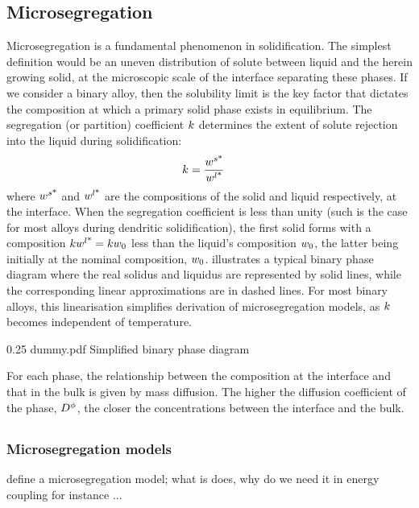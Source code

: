 \subsection{Microsegregation}
Microsegregation is a fundamental phenomenon in solidification. The simplest definition would be 
an uneven distribution of solute between liquid and the herein growing solid, at the microscopic scale
of the interface separating these phases. If we consider a binary alloy, then the solubility limit is 
the key factor that dictates the composition at which a primary solid phase exists in equilibrium. 
The segregation (or partition) coefficient $k$ determines the extent of solute rejection into the liquid during solidification:
\begin{align}
\label{eq:partition}
& k = \frac{{w}^{s \text{*}} }{{w}^{l \text{*}} }
\end{align}
where ${w}^{s \text{*}} $ and ${w}^{l \text{*}} $ are the compositions of the solid and liquid respectively, at the interface. When the 
segregation coefficient is less than unity (such is the case for most alloys during dendritic solidification), 
the first solid forms with a composition $k {w}^{l \text{*}} =k {w}_0$ less than the liquid's 
composition ${w}_0$, the latter being initially at the nominal composition, ${w}_0$.  illustrates a typical binary 
phase diagram where the real solidus and liquidus are represented by solid lines, while the corresponding linear approximations are in dashed lines.
For most binary alloys, this linearisation simplifies derivation of microsegregation models, as $k$ becomes independent of temperature.
\begin{figureth}
{0.25}
{dummy.pdf}
{Simplified binary phase diagram}
\label{fig:binary_diag}
\end{figureth}
For each phase, the relationship between the composition at the interface and that in the bulk is given by mass diffusion.
The higher the diffusion coefficient of the phase, $D^\phi$, the closer the concentrations between the interface and the bulk.
%
\begin{align}
\label{eq:eq}
& 
\end{align}
%


\subsubsection{Microsegregation models}
define a microsegregation model; what is does, why do we need it in energy coupling for instance ...
